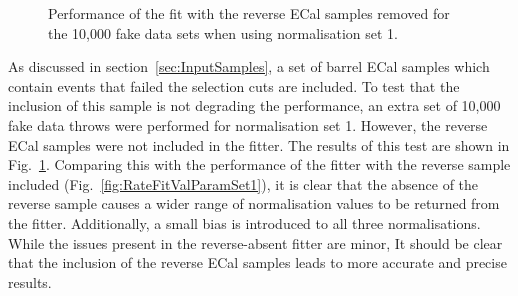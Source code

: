 \begin{figure}%
  \centering
  \hspace{1em}
  \caption{Performance of the fit with the reverse ECal samples removed for the 10,000 fake data sets when using normalisation set 1.}
  \label{fig:RateFitValParamSet1NoReverse}
\end{figure}
\newline
\newline
As discussed in section~\ref{sec:InputSamples}, a set of barrel ECal samples which contain events that failed the selection cuts are included.  To test that the inclusion of this sample is not degrading the performance, an extra set of 10,000 fake data throws were performed for normalisation set 1.  However, the reverse ECal samples were not included in the fitter.  The results of this test are shown in Fig.~\ref{fig:RateFitValParamSet1NoReverse}.  Comparing this with the performance of the fitter with the reverse sample included (Fig.~\ref{fig:RateFitValParamSet1}), it is clear that the absence of the reverse sample causes a wider range of normalisation values to be returned from the fitter.  Additionally, a small bias is introduced to all three normalisations.  While the issues present in the reverse-absent fitter are minor, It should be clear that the inclusion of the reverse ECal samples leads to more accurate and precise results.

